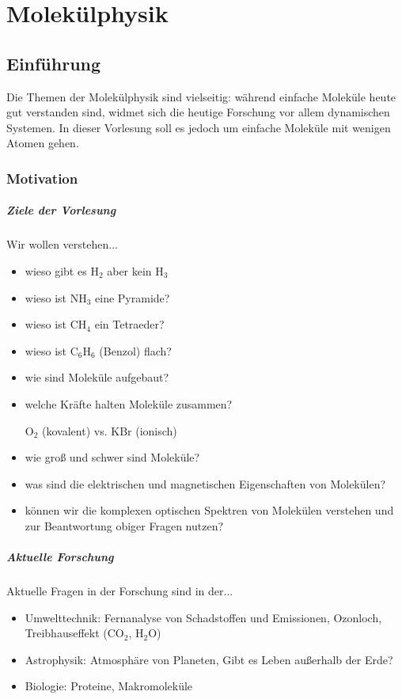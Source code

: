 \chapter{Molekülphysik}
\label{chap:molekuelphysik}
\clearpage
\section{Einführung}

\begin{verbal}
    Die Themen der Molekülphysik sind vielseitig: während einfache Moleküle heute gut verstanden sind, widmet sich die heutige Forschung vor allem dynamischen Systemen. In dieser Vorlesung soll es jedoch um einfache Moleküle mit wenigen Atomen gehen.
\end{verbal}
    \subsection{Motivation}
    \paragraph{Ziele der Vorlesung} Wir wollen verstehen...
    \begin{itemize}
    	\item wieso gibt es $\text{H}_{2}$ aber kein $\text{H}_{3}$ 
    	\item wieso ist $\text{NH}_{3}$ eine Pyramide?
    	\item wieso ist $\text{CH}_{4}$ ein Tetraeder?
    	\item wieso ist $\text{C}_{6} \text{H}_{6}$ (Benzol) flach?
    	\item wie sind Moleküle aufgebaut?
    	\item welche Kräfte halten Moleküle zusammen?
    		\begin{center}
    			$\text{O}_{2}$ (kovalent) vs. $\text{KBr}$ (ionisch)
    		\end{center}
    	\item wie groß und schwer sind Moleküle?
    	\item was sind die elektrischen und magnetischen Eigenschaften von Molekülen?
    	\item können wir die komplexen optischen Spektren von Molekülen verstehen und zur Beantwortung obiger Fragen nutzen?
    \end{itemize}
    \paragraph{Aktuelle Forschung} Aktuelle Fragen in der Forschung sind in der...
    \begin{itemize}
    	\item Umwelttechnik: Fernanalyse von Schadstoffen und Emissionen, Ozonloch, Treibhauseffekt ($\text{CO}_{2}$, $\text{H}_{2}\text{O}$)
    	\item Astrophysik: Atmosphäre von Planeten, Gibt es Leben außerhalb der Erde?
    	\item Biologie: Proteine, Makromoleküle
    \end{itemize}
    

